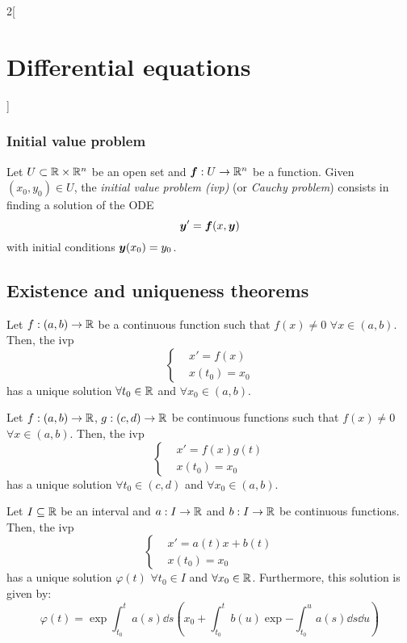 \documentclass[../../../main.tex]{subfiles}
\begin{document}
\begin{multicols}{2}[\section{Differential equations}]
  \subsubsection*{Initial value problem}
  \begin{definition}
    Let $U\subset\mathbb{R}\times\mathbb{R}^n$ be an open set and $\boldsymbol{f}:U\rightarrow\mathbb{R}^n$ be a function. Given $(x_0,y_0)\in U$, the \textit{initial value problem (ivp)} (or \textit{Cauchy problem}) consists in finding a solution of the ODE $$\boldsymbol{y}'=\boldsymbol{f}(x,\boldsymbol{y})$$ with initial conditions $\boldsymbol{y}(x_0)=y_0$.
  \end{definition}
  \subsection{Existence and uniqueness theorems}
  \begin{prop}
    Let $f:(a,b)\rightarrow\mathbb{R}$ be a continuous function such that $f(x)\ne 0$ $\forall x\in(a,b)$. Then, the ivp
    $$
      \left\{
      \begin{aligned}
         & x'      =f(x) \\
         & x(t_0)  =x_0
      \end{aligned}
      \right.
    $$
    has a unique solution $\forall t_0\in\mathbb{R}$ and $\forall x_0\in(a,b)$.
  \end{prop}
  \begin{prop}
    Let $f:(a,b)\rightarrow\mathbb{R}$, $g:(c,d)\rightarrow\mathbb{R}$ be continuous functions such that $f(x)\ne 0$ $\forall x\in(a,b)$. Then, the ivp
    $$\left\{
      \begin{aligned}
         & x'      =f(x)g(t) \\
         & x(t_0)  =x_0
      \end{aligned}
      \right.$$
    has a unique solution $\forall t_0\in(c,d)$ and $\forall x_0\in(a,b)$.
  \end{prop}
  \begin{prop}
    Let $I\subseteq\mathbb{R}$ be an interval and $a:I\rightarrow\mathbb{R}$ and $b:I\rightarrow\mathbb{R}$ be continuous functions. Then, the ivp
    $$\left\{
      \begin{aligned}
         & x'      =a(t)x+b(t) \\
         & x(t_0)  =x_0
      \end{aligned}
      \right.$$
    has a unique solution $\varphi(t)$ $\forall t_0\in I$ and $\forall x_0\in\mathbb{R}$. Furthermore, this solution is given by:
    $$\varphi(t)=\exp{\int_{t_0}^ta(s)\dd s}\left(x_0+\int_{t_0}^tb(u)\exp{-\int_{t_0}^ua(s)\dd s}\dd u\right)$$
  \end{prop}

\end{multicols}
\end{document}
